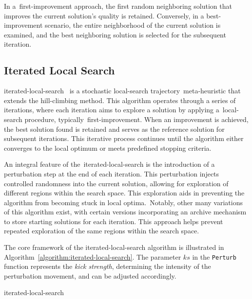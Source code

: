 In a~\acrshort{first-improvement} approach, the first random neighboring solution that
improves the current solution's quality is retained. Conversely, in a
\acrshort{best-improvement} scenario, the entire neighborhood of the current
solution is examined, and the best neighboring solution is selected for the
subsequent iteration.

\subsection{Iterated Local Search}
\label{subsec:iterated-local-search}

\acrfull{iterated-local-search}~\cite{lourenco2010iterateda,luke2013essentialsa,blum2003metaheuristics}
is a stochastic \acrshort{local-search} trajectory~\acrshort{meta-heuristic} that
extends the \acrshort{hill-climbing} method. This algorithm operates through a
series of iterations, where each iteration aims to explore a solution by
applying a~\acrshort{local-search} procedure,
typically~\acrshort{first-improvement}. When an improvement is achieved, the
best solution found is retained and serves as the reference solution for
subsequent iterations. This iterative process continues until the algorithm
either converges to the local optimum or meets predefined stopping criteria.

An integral feature of the~\acrshort{iterated-local-search} is the introduction
of a perturbation step at the end of each iteration. This perturbation injects
controlled randomness into the current solution, allowing for exploration of
different regions within the search space. This exploration aids in preventing
the algorithm from becoming stuck in local optima.~Notably, other many
variations of this algorithm exist, with certain versions incorporating an
archive mechanism to store starting solutions for each iteration. This approach
helps prevent repeated exploration of the same regions within the search space.

The core framework of the \acrshort{iterated-local-search} algorithm is
illustrated in Algorithm~\ref{algorithm:iterated-local-search}. The parameter
$ks$ in the \texttt{Perturb} function represents the \textit{kick strength},
determining the intensity of the perturbation movement, and can be
adjusted accordingly.

\begin{algorithm}
  
  \caption{\acrlong{iterated-local-search}}
  \label{algorithm:iterated-local-search}
\end{algorithm}

